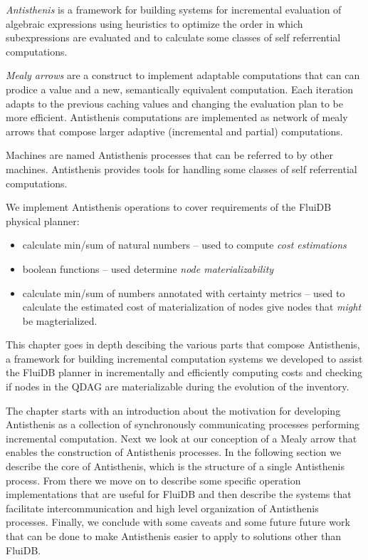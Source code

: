 

\begin{summary}
\item \emph{Antisthenis} is a framework for building systems for
  incremental evaluation of algebraic expressions using heuristics to
  optimize the order in which subexpressions are evaluated and to
  calculate some classes of self referrential computations.
\item \emph{Mealy arrows} are a construct to implement adaptable
  computations that can can prodice a value and a new, semantically
  equivalent computation. Each iteration adapts to the previous
  caching values and changing the evaluation plan to be more
  efficient. Antisthenis computations are implemented as network of
  mealy arrows that compose larger adaptive (incremental and partial)
  computations.
\item Machines are named Antisthenis processes that can be referred to
  by other machines. Antisthenis provides tools for handling some
  classes of self referrential computations.
\item We implement Antisthenis operations to cover requirements of the
  FluiDB physical planner:

  \begin{itemize}
  \item calculate min/sum of natural numbers -- used to compute
    \emph{cost estimations}
  \item boolean functions -- used determine \emph{node materializability}
  \item calculate min/sum of numbers annotated with certainty metrics
    -- used to calculate the estimated cost of materialization of
    nodes give nodes that \emph{might} be magterialized.
  \end{itemize}
\end{summary}

This chapter goes in depth descibing the various parts that compose
Antisthenis, a framework for building incremental computation systems
we developed to assist the FluiDB planner in incrementally and
efficiently computing costs and checking if nodes in the QDAG are
materializable during the evolution of the inventory.

The chapter starts with an introduction about the motivation for
developing Antisthenis as a collection of synchronously communicating
processes performing incremental computation. Next we look at our
conception of a Mealy arrow that enables the construction of
Antisthenis processes. In the following section we describe the core
of Antisthenis, which is the structure of a single Antisthenis
process. From there we move on to describe some specific operation
implementations that are useful for FluiDB and then describe the
systems that facilitate intercommunication and high level organization
of Antisthenis processes. Finally, we conclude with some caveats and
some future future work that can be done to make Antisthenis easier to
apply to solutions other than FluiDB.

